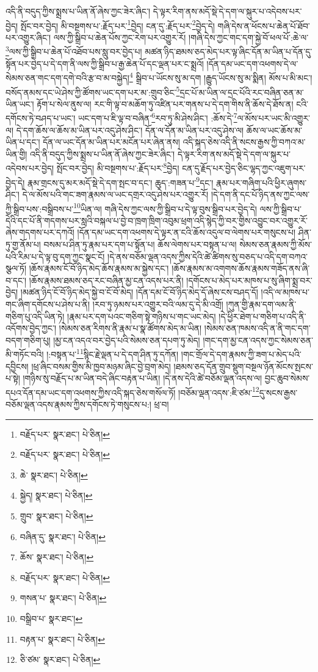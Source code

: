 འདི་ནི་བདུད་ཀྱིས་སྨྲས་པ་ཡིན་ནོ་ཞེས་ཀྱང་ཟེར་ཞིང་། དེ་ལྟར་རིག་ནས་མདོ་སྡེ་དེ་དག་ལ་སྐུར་པ་འདེབས་པར་བྱེད། སྤོང་བར་བྱེད། མི་བསྔགས་པ་:རྗོད་པར་\footnote{བརྗོད་པར་  སྣར་ཐང་།  པེ་ཅིན། }བྱེད། ངན་དུ་:རྗོད་པར་\footnote{བརྗོད་པར་  སྣར་ཐང་།  པེ་ཅིན། }བྱེད་དེ། གཞི་དེས་ན་ཕོངས་པ་ཆེན་པོ་ཐོབ་པར་འགྱུར་ཞིང་། ལས་ཀྱི་སྒྲིབ་པ་ཆེན་པོས་ཀྱང་རེག་པར་འགྱུར་རོ། །གཞི་དེས་ཀྱང་གང་དག་སྐྱེ་བོ་ཕལ་པོ་:ཆེ་ལ་\footnote{ཆེ་  སྣར་ཐང་།  པེ་ཅིན། }ལས་ཀྱི་སྒྲིབ་པ་ཆེན་པོ་འཐོབ་པས་སླུ་བར་བྱེད་པ། མཚན་ཉིད་ཐམས་ཅད་མེད་པར་ལྟ་ཞིང་དོན་མ་ཡིན་པ་དོན་དུ་སྟོན་པར་བྱེད་པ་དེ་དག་ནི་ལས་ཀྱི་སྒྲིབ་པ་རྒྱ་ཆེན་པོ་དང་ལྡན་པར་ང་སྨྲའོ། །དོན་དམ་ཡང་དག་འཕགས་དེ་ལ་སེམས་ཅན་གང་དག་དགེ་བའི་རྩ་བ་མ་བསྐྱེད།\footnote{སྐྱེད།  སྣར་ཐང་།  པེ་ཅིན། } སྒྲིབ་པ་ཡོངས་སུ་མ་དག །རྒྱུད་ཡོངས་སུ་མ་སྨིན། མོས་པ་མི་མང་། བསོད་ནམས་དང་ཡེ་ཤེས་ཀྱི་ཚོགས་ཡང་དག་པར་མ་:གྲུབ་ཅིང་\footnote{གྲུབ་  སྣར་ཐང་།  པེ་ཅིན། }དྲང་པོ་མ་ཡིན་ལ་དྲང་པོའི་རང་བཞིན་ཅན་མ་ཡིན་ཡང་། རྟོག་པ་སེལ་ནུས་ལ། རང་གི་ལྟ་བ་མཆོག་ཏུ་འཛིན་པར་གནས་པ་དེ་དག་གིས་ནི་ཆོས་དེ་ཐོས་ན། ངའི་དགོངས་ཏེ་བཤད་པ་ཡང་། ཡང་དག་པ་ཇི་ལྟ་བ་བཞིན་\footnote{བཞིན་དུ་  སྣར་ཐང་།  པེ་ཅིན། }རབ་ཏུ་མི་ཤེས་ཤིང་། :ཆོས་དེ་\footnote{ཆོས་  སྣར་ཐང་།  པེ་ཅིན། }ལ་མོས་པར་ཡང་མི་འགྱུར་ལ། དེ་དག་ཆོས་ལ་ཆོས་མ་ཡིན་པར་འདུ་ཤེས་ཤིང་། དོན་ལ་དོན་མ་ཡིན་པར་འདུ་ཤེས་ལ། ཆོས་ལ་ཡང་ཆོས་མ་ཡིན་པ་དང་། དོན་ལ་ཡང་དོན་མ་ཡིན་པར་མངོན་པར་ཞེན་ནས། འདི་སྐད་ཅེས་འདི་ནི་སངས་རྒྱས་ཀྱི་བཀའ་མ་ཡིན་གྱི། འདི་ནི་བདུད་ཀྱིས་སྨྲས་པ་ཡིན་ནོ་ཞེས་ཀྱང་ཟེར་ཞིང་། དེ་ལྟར་རིག་ནས་མདོ་སྡེ་དེ་དག་ལ་སྐུར་པ་འདེབས་པར་བྱེད། སྤོང་བར་བྱེད། མི་བསྔགས་པ་:རྗོད་པར་\footnote{བརྗོད་པར་  སྣར་ཐང་།  པེ་ཅིན། }བྱེད། ངན་དུ་རྗོད་པར་བྱེད་ཅིང་ལྷད་ཀྱང་འཇུག་པར་བྱེད་དེ། རྣམ་གྲངས་དུ་མར་མདོ་སྡེ་དེ་དག་སྤང་བ་དང་། ཆུད་:གཟན་པ་\footnote{གསན་པ་  སྣར་ཐང་།  པེ་ཅིན། }དང་། རྣམ་པར་གཞིག་པའི་ཕྱིར་ཞུགས་ཤིང་། དེ་ལ་མོས་པའི་གང་ཟག་རྣམས་ལ་ཡང་དགྲར་འདུ་ཤེས་པར་འགྱུར་རོ། །དེ་དག་ནི་དང་པོ་ཉིད་ནས་ཀྱང་ལས་ཀྱི་སྒྲིབ་པས་:བསྒྲིབས་པ་\footnote{བསྒྲིབ་པ་  སྣར་ཐང་། }ཡིན་ལ། གཞི་དེས་ཀྱང་ལས་ཀྱི་སྒྲིབ་པ་དེ་ལྟ་བུས་སྒྲིབ་པར་བྱེད་དེ། ལས་ཀྱི་སྒྲིབ་པ་དེའི་དང་པོ་ནི་གདགས་པར་སླའི་བསྐལ་པ་བྱེ་བ་ཁྲག་ཁྲིག་འབུམ་ཕྲག་འདི་སྙེད་ཀྱི་བར་གྱིས་འབྱུང་བར་འགྱུར་རོ་ཞེས་གདགས་པར་དཀའོ། །དོན་དམ་ཡང་དག་འཕགས་དེ་ལྟར་ན་ངའི་ཆོས་འདུལ་བ་ལེགས་པར་གསུངས་པ། ཤིན་ཏུ་གྱ་ནོམ་པ། བསམ་པ་ཤིན་ཏུ་རྣམ་པར་དག་པ་སྟོན་པ། ཆོས་ལེགས་པར་བསྟན་པ་ལ། སེམས་ཅན་རྣམས་ཀྱི་མོས་པའི་རིམ་པ་དེ་ལྟ་བུ་དག་ཀྱང་སྣང་ངོ། །དེ་ནས་བཅོམ་ལྡན་འདས་ཀྱིས་དེའི་ཚེ་ཚིགས་སུ་བཅད་པ་འདི་དག་བཀའ་སྩལ་ཏོ། །ཆོས་རྣམས་ངོ་བོ་ཉིད་མེད་ཆོས་རྣམས་མ་སྐྱེས་དང་། །ཆོས་རྣམས་མ་འགགས་ཆོས་རྣམས་གཟོད་ནས་ཞི་བ་དང་། །ཆོས་རྣམས་ཐམས་ཅད་རང་བཞིན་མྱ་ངན་འདས་པར་ནི། །དགོངས་པ་མེད་པར་མཁས་པ་སུ་ཞིག་སྨྲ་བར་བྱེད། །མཚན་ཉིད་ངོ་བོ་ཉིད་མེད་སྐྱེ་བ་ངོ་བོ་མེད། །དོན་དམ་ངོ་བོ་ཉིད་མེད་དོ་ཞེས་ངས་བཤད་དོ། །འདི་ལ་མཁས་པ་གང་ཞིག་དགོངས་པ་ཤེས་པ་ནི། །རབ་ཏུ་ཉམས་པར་འགྱུར་བའི་ལམ་དུ་དེ་མི་འགྲོ། །ཀུན་གྱི་རྣམ་དག་ལམ་ནི་གཅིག་པུ་འདི་ཡིན་ཏེ། །རྣམ་པར་དག་པའང་གཅིག་སྟེ་གཉིས་པ་གང་ཡང་མེད། །དེ་ཕྱིར་ཐེག་པ་གཅིག་པ་འདི་ནི་འདོགས་བྱེད་ཀྱང་། །སེམས་ཅན་རིགས་ནི་རྣམ་པ་སྣ་ཚོགས་མེད་མ་ཡིན། །སེམས་ཅན་ཁམས་འདི་ན་ནི་གང་དག་བདག་གཅིག་པུ། །མྱ་ངན་འདའ་བར་བྱེད་པའི་སེམས་ཅན་དཔག་ཏུ་མེད། །གང་དག་མྱ་ངན་འདས་ཀྱང་སེམས་ཅན་མི་གཏོང་བའི། །:བསྟན་པ་\footnote{བརྟན་པ་  སྣར་ཐང་།  པེ་ཅིན། }སྙིང་རྗེ་ལྡན་པ་དེ་དག་ཤིན་ཏུ་དཀོན། །གང་གྲོལ་དེ་དག་རྣམས་ཀྱི་ཟག་པ་མེད་པའི་དབྱིངས། །ཕྲ་ཞིང་བསམ་གྱིས་མི་ཁྱབ་མཉམ་ཞིང་བྱེ་བྲག་མེད། །ཐམས་ཅད་དོན་གྲུབ་སྡུག་བསྔལ་ཉོན་མོངས་སྤངས་པ་སྟེ། །གཉིས་སུ་བརྗོད་པ་མ་ཡིན་བདེ་ཞིང་བརྟན་པ་ཡིན། །དེ་ནས་དེའི་ཚེ་བཅོམ་ལྡན་འདས་ལ། བྱང་ཆུབ་སེམས་དཔའ་དོན་དམ་ཡང་དག་འཕགས་ཀྱིས་འདི་སྐད་ཅེས་གསོལ་ཏོ། །བཅོམ་ལྡན་འདས་:ཇི་ཙམ་\footnote{ཅི་ཙམ་  སྣར་ཐང་།  པེ་ཅིན། }དུ་སངས་རྒྱས་བཅོམ་ལྡན་འདས་རྣམས་ཀྱིས་དགོངས་ཏེ་གསུངས་པ:། ཕྲ་བ། 